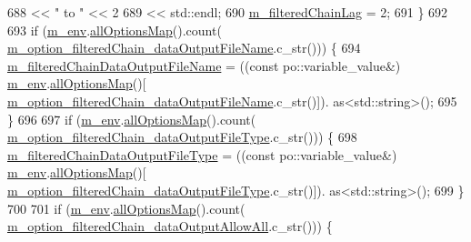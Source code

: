 \begin{DoxyCode}
{{{{688               << \textcolor{stringliteral}{" to "}                     << 2
689               << std::endl;
690     \hyperlink{class_q_u_e_s_o_1_1_m_l_sampling_level_options_a6740efa52d4f8ec112be817f5220cf94}{m\_filteredChainLag} = 2;
691   \}
692 
693   \textcolor{keywordflow}{if} (\hyperlink{class_q_u_e_s_o_1_1_m_l_sampling_level_options_a5bdc1fb3f6eb46f73feec9c356c9a1b8}{m\_env}.\hyperlink{class_q_u_e_s_o_1_1_base_environment_ae7cee155956e0e70112f45e2ad1f02c8}{allOptionsMap}().count(
      \hyperlink{class_q_u_e_s_o_1_1_m_l_sampling_level_options_af9ec9aa644d0ee22a42a2aa7fdf49218}{m\_option\_filteredChain\_dataOutputFileName}.c\_str())) \{
694     \hyperlink{class_q_u_e_s_o_1_1_m_l_sampling_level_options_abf333c405ee097104ee9b1b1e92ecd97}{m\_filteredChainDataOutputFileName} = ((\textcolor{keyword}{const} po::variable\_value&) 
      \hyperlink{class_q_u_e_s_o_1_1_m_l_sampling_level_options_a5bdc1fb3f6eb46f73feec9c356c9a1b8}{m\_env}.\hyperlink{class_q_u_e_s_o_1_1_base_environment_ae7cee155956e0e70112f45e2ad1f02c8}{allOptionsMap}()[
      \hyperlink{class_q_u_e_s_o_1_1_m_l_sampling_level_options_af9ec9aa644d0ee22a42a2aa7fdf49218}{m\_option\_filteredChain\_dataOutputFileName}.c\_str()]).
      as<std::string>();
695   \}
696 
697   \textcolor{keywordflow}{if} (\hyperlink{class_q_u_e_s_o_1_1_m_l_sampling_level_options_a5bdc1fb3f6eb46f73feec9c356c9a1b8}{m\_env}.\hyperlink{class_q_u_e_s_o_1_1_base_environment_ae7cee155956e0e70112f45e2ad1f02c8}{allOptionsMap}().count(
      \hyperlink{class_q_u_e_s_o_1_1_m_l_sampling_level_options_a39e79ec1b87802ecd32bf4999908ecbf}{m\_option\_filteredChain\_dataOutputFileType}.c\_str())) \{
698     \hyperlink{class_q_u_e_s_o_1_1_m_l_sampling_level_options_a154ba7fd5c2fbc98af0ac91bb022a232}{m\_filteredChainDataOutputFileType} = ((\textcolor{keyword}{const} po::variable\_value&) 
      \hyperlink{class_q_u_e_s_o_1_1_m_l_sampling_level_options_a5bdc1fb3f6eb46f73feec9c356c9a1b8}{m\_env}.\hyperlink{class_q_u_e_s_o_1_1_base_environment_ae7cee155956e0e70112f45e2ad1f02c8}{allOptionsMap}()[
      \hyperlink{class_q_u_e_s_o_1_1_m_l_sampling_level_options_a39e79ec1b87802ecd32bf4999908ecbf}{m\_option\_filteredChain\_dataOutputFileType}.c\_str()]).
      as<std::string>();
699   \}
700 
701   \textcolor{keywordflow}{if} (\hyperlink{class_q_u_e_s_o_1_1_m_l_sampling_level_options_a5bdc1fb3f6eb46f73feec9c356c9a1b8}{m\_env}.\hyperlink{class_q_u_e_s_o_1_1_base_environment_ae7cee155956e0e70112f45e2ad1f02c8}{allOptionsMap}().count(
      \hyperlink{class_q_u_e_s_o_1_1_m_l_sampling_level_options_a87338f130d6059b62643ad609f26bfb6}{m\_option\_filteredChain\_dataOutputAllowAll}.c\_str())) \{
}}}}
\end{DoxyCode}
